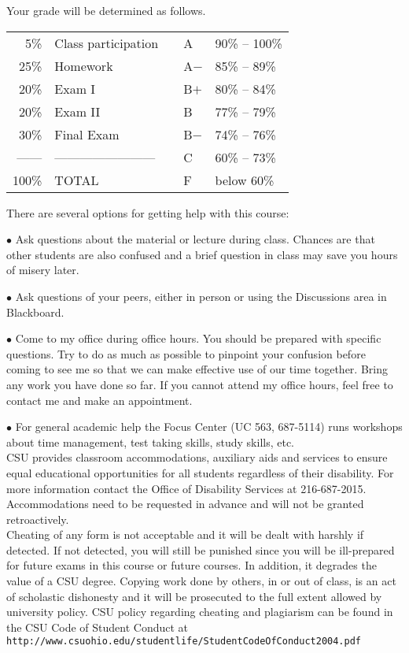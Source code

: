 \documentclass[11pt]{article}
\begin{document}
Your grade will be determined as follows. 

\medskip


\begin{tabular}{rlp{4cm}ll}
5\% & Class participation & & A & 90\% -- 100\%\\
25\% & Homework & & A$-$ & 85\% -- 89\%\\
20\% &  Exam I & & B$+$ & 80\% -- 84\%\\ 
20\% & Exam II & & B & 77\% -- 79\%\\
30\% & Final Exam  & & B$-$ & 74\% -- 76\%\\
------ & ------------------------ & & C & 60\% -- 73\%\\
100\% & TOTAL  & & F & below 60\%\\ 
\end{tabular}

\bigskip


There are several options for getting help with this course:

$\bullet$ Ask questions about the material or lecture during
class. Chances are that other students are also confused and a brief
question in class may save you hours of misery later.
  
$\bullet$ Ask questions of your peers, either in person or using the
Discussions area in Blackboard. 

$\bullet$ Come to my office during office hours. You should be
prepared with specific questions. Try to do as much as possible to
pinpoint your confusion before coming to see me so that we can make
effective use of our time together. Bring any work you have done so
far. If you cannot attend my office hours, feel free to contact me and
make an appointment.
  
$\bullet$ For general academic help the Focus Center (UC 563,
687-5114) runs workshops about time management, test taking skills,
study skills, etc. \\

 CSU provides 
classroom accommodations, auxiliary aids and services to ensure equal educational
opportunities for all students regardless of their disability. For more information contact
the Office of Disability Services at 216-687-2015. Accommodations need to be
requested in advance and will not be granted retroactively.\\

 Cheating of any form is not
acceptable and it will be dealt with harshly if detected. If not
detected, you will still be punished since you will be ill-prepared
for future exams in this course or future courses. In addition, it
degrades the value of a CSU degree.
Copying work done by others, in or out of class, is an act of
scholastic dishonesty and it will be prosecuted to the full extent
allowed by university policy. 
CSU policy regarding cheating and plagiarism can be found in the CSU
Code of Student Conduct at
{\tt http://www.csuohio.edu/studentlife/StudentCodeOfConduct2004.pdf}\\
\end{document}
